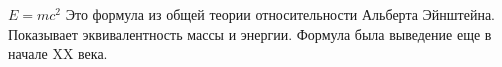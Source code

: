 \documentclass[14pt, a4paper]{extarticle}
\begin{document}
$E = mc^{2}$
Это формула из общей теории относительности Альберта Эйнштейна.
Показывает эквивалентность массы и энергии.
Формула была выведение еще в начале XX века.
\end{document}
